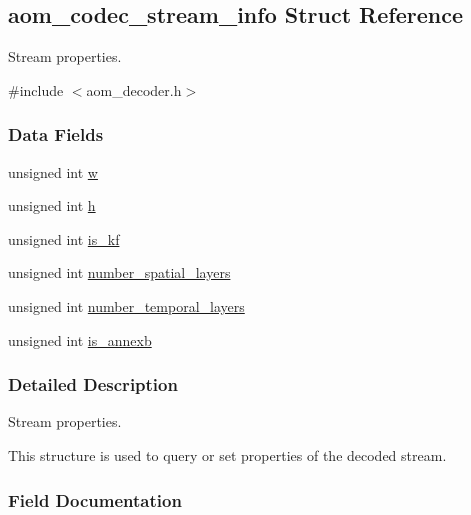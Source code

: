 \hypertarget{structaom__codec__stream__info}{}\subsection{aom\+\_\+codec\+\_\+stream\+\_\+info Struct Reference}
\label{structaom__codec__stream__info}


Stream properties.  




{\ttfamily \#include $<$aom\+\_\+decoder.\+h$>$}

\subsubsection*{Data Fields}
\begin{DoxyCompactItemize}
\item 
unsigned int \hyperlink{structaom__codec__stream__info_add84a2752fefd706f893fbc41ba6b9f2}{w}
\item 
unsigned int \hyperlink{structaom__codec__stream__info_a2f1c33e3b980b274176545340b474e34}{h}
\item 
unsigned int \hyperlink{structaom__codec__stream__info_a0264e63c333ff05b2afd6df478ed807c}{is\+\_\+kf}
\item 
unsigned int \hyperlink{structaom__codec__stream__info_af7487a0e56b6919f94a7e426abd44eac}{number\+\_\+spatial\+\_\+layers}
\item 
unsigned int \hyperlink{structaom__codec__stream__info_a8845a384d9d0b3d8670b8ad98b720c0e}{number\+\_\+temporal\+\_\+layers}
\item 
unsigned int \hyperlink{structaom__codec__stream__info_a1572ce7a1105c1db0a9dd43acb77b6c4}{is\+\_\+annexb}
\end{DoxyCompactItemize}


\subsubsection{Detailed Description}
Stream properties. 

This structure is used to query or set properties of the decoded stream. 

\subsubsection{Field Documentation}
\mbox{\label{structaom__codec__stream__info_add84a2752fefd706f893fbc41ba6b9f2}} 
